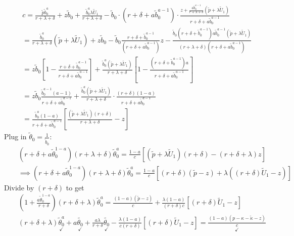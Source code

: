 \documentclass[12pt]{article} %
\theoremstyle{definition}
\begin{document}
\begin{eqnarray*}
&& c =  \frac{\tilde{p}\tilde{b}_0^a}{r+\lambda+\delta} + z\tilde{b}_0 + \frac{\tilde{b}_0^a \lambda \tilde{U}_1}{r+\lambda+\delta} - \tilde{b}_0 \cdot (r+\delta+a\tilde{b}_0^{a-1}) \cdot \frac{z + \frac{a \tilde{b}_0^{a-1}}{r+\lambda+\delta} (\tilde{p}+\lambda \tilde{U}_1)}{r+\delta+a\tilde{b}_0^{a-1}}\\ 
&& =  \frac{\tilde{b}_0^a}{r+\lambda+\delta} (\tilde{p}+\lambda \tilde{U}_1) + z\tilde{b}_0 - \tilde{b}_0 \frac{r+\delta+\tilde{b}_0^{a-1}}{(r+\delta+a\tilde{b}_0^{a-1})}z - \frac{\tilde{b}_0(r+\delta+\tilde{b}_0^{a-1})a\tilde{b}_0^{a-1}(\tilde{p}+\lambda \tilde{U}_1)}{(r+\lambda+\delta)(r+\delta+a\tilde{b}_0^{a-1})} \\ 
&& = z\tilde{b}_0 \left[1 - \frac{r+\delta+\tilde{b}_0^{a-1}}{r+\delta+a\tilde{b}_0^{a-1}}\right] + \frac{\tilde{b}_0^a(\tilde{p}+\lambda \tilde{U}_1)}{r+\lambda+\delta}\left[1 - \frac{(r+\delta+\tilde{b}_0^{a-1})a}{r+\delta+a\tilde{b}_0^{a-1}}\right] \\ 
&& = z\tilde{b}_0 \frac{\tilde{b}_0^{a-1}(a-1)}{r+\delta+a\tilde{b}_0^{a-1}} + \frac{\tilde{b}_0^a(\tilde{p}+\lambda \tilde{U}_1)}{r+\lambda+\delta} \cdot \frac{(r+\delta)(1-a)}{r+\delta+a\tilde{b}_0^{a-1}} \\
&& = \frac{\tilde{b}_0^{a}(1-a)}{r+\delta+a\tilde{b}_0^{a-1}} \left[ \frac{(\tilde{p}+\lambda \tilde{U}_1)(r+\delta)}{r+\lambda+\delta} - z \right]
\end{eqnarray*}
Plug in $\tilde{\theta}_0 = \frac{1}{\tilde{b}_0}$:
\begin{eqnarray*}
&& (r+\delta+a\tilde{\theta}_0^{1-a})(r+\lambda+\delta)\tilde{\theta}_0^a = \frac{1-a}{c} [(\tilde{p}+\lambda \tilde{U}_1)(r+\delta) - (r+\delta+\lambda)z] \\
&& \implies (r+\delta+a\tilde{\theta}_0^{1-a})(r+\lambda+\delta)\tilde{\theta}_0^a = \frac{1-a}{c} [(r+\delta)(\tilde{p}-z) +\lambda ((r+\delta)\tilde{U}_1-z)] 
\end{eqnarray*}
Divide by $(r+\delta)$ to get
\begin{eqnarray*}
&& (1+\frac{a\tilde{\theta}_0^{1-a}}{r+\delta})(r+\delta+\lambda)\tilde{\theta}_0^a = \frac{(1-a)(\tilde{p}-z)}{c} + \frac{\lambda(1-a)}{(r+\delta)c}[(r+\delta)\tilde{U}_1-z] \\
&&(r+\delta+\lambda) \underset{\checkmark}{\tilde{\theta}_0^a} + a \underset{\checkmark}{\tilde{\theta_0}} + \frac{a\lambda}{r+\delta} \underset{\checkmark}{\tilde{\theta_0}} - \frac{\lambda(1-a)}{c(r+\delta)}[(r+\delta)\tilde{U}_1 - z] = \underset{\checkmark}{\frac{(1-a)(p - \kappa - \tilde{\kappa} - z)}{c}}
\end{eqnarray*}
\end{document}
